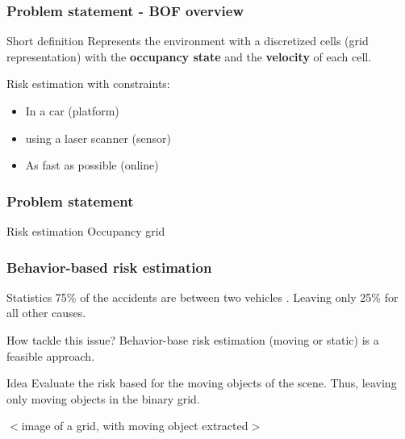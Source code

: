 \documentclass{beamer}
\begin{document}
\begin{frame}
		
				
				
	\end{frame}
	
	\begin{frame}
		\frametitle{Problem statement - BOF overview}
		\begin{block}{Short definition}
			 Represents the environment with a discretized cells (grid representation) with the \textbf{occupancy state} and the \textbf{velocity} of each cell.
		\end{block}
		Risk estimation with constraints:
		\begin{itemize}
			\item In a car (platform)
			\item using a laser scanner (sensor)
			\item As fast as possible (online)
		\end{itemize}
	\end{frame}

	\begin{frame}
		\frametitle{Problem statement}
		Risk estimation
		Occupancy grid	
	\end{frame}
	
	\begin{frame}
		\frametitle{Behavior-based risk estimation}
		
		\begin{block}{Statistics}
		75\% of the accidents are between two vehicles \cite{Hurt_1981}. Leaving only 25\% for all other causes.
		\end{block}

		\begin{exampleblock}{How tackle this issue?}
		Behavior-base risk estimation (moving or static) is a feasible approach.
		\end{exampleblock}

		\begin{alertblock}{Idea}
			Evaluate the risk based for the moving objects of the scene. Thus, leaving only moving objects in the binary grid.
		\end{alertblock}

		$<$image of a grid, with moving object extracted$>$

		

	\end{frame}
\end{document}
